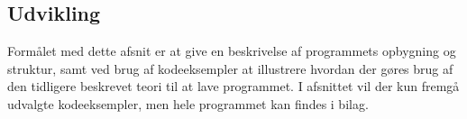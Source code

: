 \subsection{Udvikling}
Formålet med dette afsnit er at give en beskrivelse af programmets opbygning og struktur, samt ved brug af kodeeksempler at illustrere hvordan der gøres brug af den tidligere beskrevet teori til at lave programmet. I afsnittet vil der kun fremgå udvalgte kodeeksempler, men hele programmet kan findes i bilag. 



















